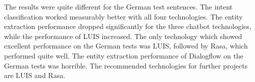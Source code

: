 The results were quite different for the German test sentences.
The intent classification worked measurably better with all four technologies.
The entity extraction performance dropped significantly for the three chatbot technologies, while the performance of LUIS increased.
The only technology which showed excellent performance on the German tests was LUIS, followed by Rasa, which performed quite well.
The entity extraction performance of Dialogflow on the German tests was horrible.
The recommended technologies for further projects are LUIS and Rasa.
